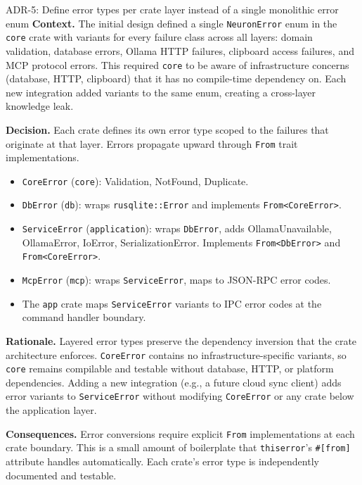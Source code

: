 \documentclass[a4paper, 11pt, oneside]{report}
\begin{document}
\begin{adrbox}{ADR-5: Define error types per crate layer instead of a single
  monolithic error enum}
\textbf{Context.}\quad
The initial design defined a single \texttt{NeuronError} enum in the
\texttt{core} crate with variants for every failure class across all
layers: domain validation, database errors, Ollama HTTP failures,
clipboard access failures, and MCP protocol errors.  This required
\texttt{core} to be aware of infrastructure concerns (database, HTTP,
clipboard) that it has no compile-time dependency on.  Each new
integration added variants to the same enum, creating a cross-layer
knowledge leak.

\textbf{Decision.}\quad
Each crate defines its own error type scoped to the failures that
originate at that layer.  Errors propagate upward through
\texttt{From} trait implementations.

\begin{itemize}
  \item \texttt{CoreError} (\texttt{core}): Validation, NotFound,
        Duplicate.
  \item \texttt{DbError} (\texttt{db}): wraps \texttt{rusqlite::Error}
        and implements \texttt{From<CoreError>}.
  \item \texttt{ServiceError} (\texttt{application}): wraps
        \texttt{DbError}, adds OllamaUnavailable, OllamaError,
        IoError, SerializationError.  Implements
        \texttt{From<DbError>} and \texttt{From<CoreError>}.
  \item \texttt{McpError} (\texttt{mcp}): wraps
        \texttt{ServiceError}, maps to JSON-RPC error codes.
  \item The \texttt{app} crate maps \texttt{ServiceError} variants to
        IPC error codes at the command handler boundary.
\end{itemize}

\textbf{Rationale.}\quad
Layered error types preserve the dependency inversion that the crate
architecture enforces.  \texttt{CoreError} contains no
infrastructure-specific variants, so \texttt{core} remains compilable
and testable without database, HTTP, or platform dependencies.  Adding
a new integration (e.g., a future cloud sync client) adds error
variants to \texttt{ServiceError} without modifying \texttt{CoreError}
or any crate below the application layer.

\textbf{Consequences.}\quad
Error conversions require explicit \texttt{From} implementations at
each crate boundary.  This is a small amount of boilerplate that
\texttt{thiserror}'s \texttt{\#[from]} attribute handles automatically.
Each crate's error type is independently documented and testable.
\end{adrbox}
\end{document}
